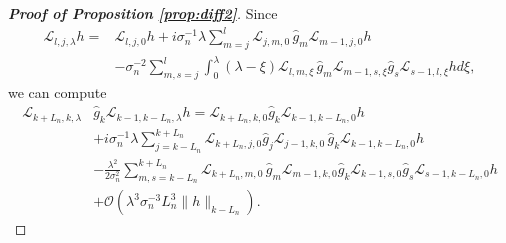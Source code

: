 \documentclass{amsart}
\numberwithin{equation}{section}
\newcommand\cL{{\mathcal L}}
\newcommand\cO{{\mathcal O}}
\begin{document}
\begin{proof}[\bf \em  Proof of Proposition \ref{prop:diff2}]
Since
\begin{equation}\label{eq:complex_2}
\begin{split}
\cL_{l,j,\lambda}h=&\cL_{l,j,0}h+i\sigma_n^{-1}\lambda\sum_{m=j}^l\cL_{j,m,0}\,\hat g_m\cL_{m-1,j,0} h\\
&-\sigma_n^{-2}\sum_{m,s=j}^l\int_0^{\lambda}(\lambda-\xi)\cL_{l,m,\xi}\,\hat g_m\cL_{m-1,s,\xi}\hat g_s\cL_{s-1,l,\xi} h d\xi,
\end{split}
\end{equation}
we can compute
\begin{equation}\label{eq:complex_3}
\begin{split}
\cL_{k+L_n,k,\lambda}&\hat g_k\cL_{k-1,k-L_n,\lambda} h=\cL_{k+L_n,k,0}\hat g_k\cL_{k-1,k-L_n,0 }h\\ &+i\sigma_n^{-1}\lambda\sum_{j=k-L_n}^{k+L_n}\cL_{k+L_n,j,0}\hat g_j\cL_{j-1,k,0}\,\hat g_k\cL_{k-1,k-L_n,0} h\\
&-\frac{\lambda^2}{2\sigma_n^{2}}\sum_{m,s=k-L_n}^{k+L_n} \cL_{k+L_n,m,0}\,\hat g_m\cL_{m-1,k,0}\hat g_k\cL_{k-1,s,0}\hat g_s\cL_{s-1,k-L_n,0} h\\
&+\cO(\lambda^3\sigma_n^{-3}L_n^3\|h\|_{k-L_n}).
\end{split}
\end{equation}


\end{proof}
\end{document}
